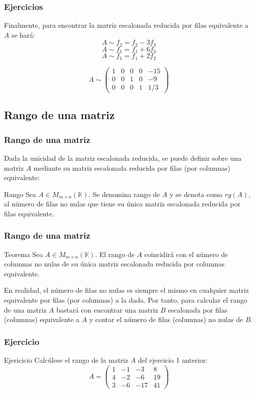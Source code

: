 \documentclass[12pt]{article}
\begin{document}
  \begin{frame}
  \frametitle{Ejercicios}
Finalmente, para encontrar la matriz escalonada reducida por filas equivalente a $A$ se har\'a:
\[A\sim f_2 = f_2-3f_3\]
\[A\sim f_1 = f_1+6f_3\]
\[A\sim f_1 = f_1+2f_2\]

\[A\sim \left(\begin{array}{ccccc}1 & 0 & 0 & 0 &-15 \\ 0 & 0 & 1 & 0 & -9 \\0 & 0 & 0 & 1 & 1/3\end{array}\right)\]
  \end{frame}   
  
  \subsection{Rango de una matriz}
 
  \begin{frame}
  \frametitle{Rango de una matriz}
Dada la unicidad de la matriz escalonada reducida, se puede definir sobre una matriz $A$ mediante su matriz escalonada reducida por filas (por columnas) equivalente:
   \begin{block}{Rango}
Sea $A\in M_{m\times n}(\mathbb{K})$. Se denomina rango de $A$ y se denota como $rg(A)$, al número de filas no nulas que tiene su \'unica matriz escalonada reducida por filas equivalente.
\end{block}
  \end{frame}   

  \begin{frame}
  \frametitle{Rango de una matriz}
   \begin{block}{Teorema}
Sea $A\in M_{m\times n}(\mathbb{K})$. El rango de $A$ coincidir\'a con el n\'umero de columnas no nulas de su \'unica matriz escalonada reducida por columnas equivalente.
\end{block}
En realidad, el n\'umero de filas no nulas es siempre el mismo en cualquier matriz equivalente por filas (por columnas) a la dada. Por tanto, para calcular el rango de una matriz $A$ bastar\'a con encontrar una matriz $B$ escalonada por filas (columnas) equivalente a $A$ y contar el n\'umero de filas (columnas) no nulas de $B$.
  \end{frame}   
  
  
     \begin{frame}
  \frametitle{Ejercicio}
   \begin{block}{Ejericicio}
Calc\'ulese el rango de la matriz $A$ del ejercicio 1 anterior:
\[A= \left(\begin{array}{cccc}1 & -1 & -3 & 8 \\4 & -2 & -6 & 19 \\3 & -6 & -17 & 41\end{array}\right)\]
\end{block}
  \end{frame} 
  
\end{document}
